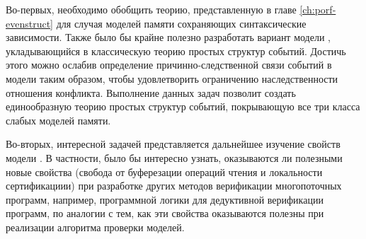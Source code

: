 Во-первых, необходимо обобщить теорию, представленную в главе \ref{ch:porf-evenstruct}
для случая моделей памяти сохраняющих синтаксические зависимости.
Также было бы крайне полезно разработать вариант модели \Wkm,
укладывающийся в классическую теорию простых структур событий. 
Достичь этого можно ослабив определение причинно-следственной связи
событий в модели \Wkm таким образом, чтобы удовлетворить
ограничению наследственности отношения конфликта.
Выполнение данных задач позволит создать единообразную
теорию простых структур событий, покрывающую
все три класса слабых моделей памяти.

Во-вторых, интересной задачей представляется
дальнейшее изучение свойств модели \WkmS.
В частности, было бы интересно узнать,
оказываются ли полезными новые свойства \WkmS
(свобода от буферезации операций чтения и локальности сертификациии)
при разработке других методов верификации многопоточных программ,
например, программной логики для дедуктивной верификации программ,
по аналогии с тем, как эти свойства оказываются полезны
при реализации алгоритма проверки моделей. 


